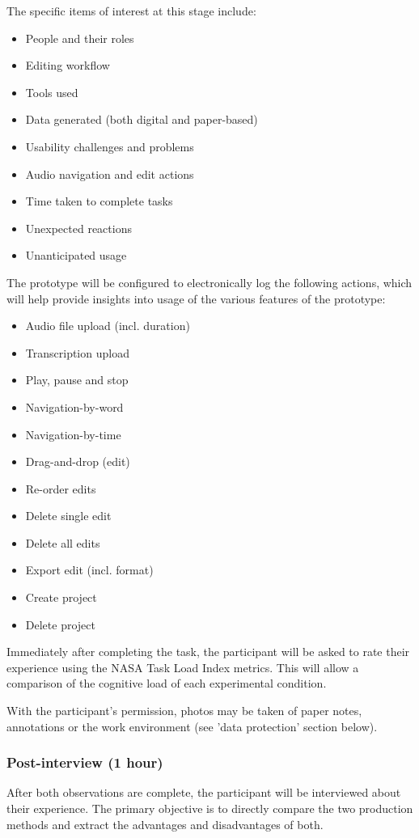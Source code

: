 The specific items of interest at this stage include:
\begin{itemize}
\item People and their roles
\item Editing workflow
\item Tools used
\item Data generated (both digital and paper-based)
\item Usability challenges and problems
\item Audio navigation and edit actions
\item Time taken to complete tasks
\item Unexpected reactions
\item Unanticipated usage
\end{itemize}

The prototype will be configured to electronically log the following actions,
which will help provide insights into usage of the various features of the
prototype:
\begin{itemize}
\item Audio file upload (incl. duration)
\item Transcription upload
\item Play, pause and stop
\item Navigation-by-word
\item Navigation-by-time
\item Drag-and-drop (edit)
\item Re-order edits
\item Delete single edit
\item Delete all edits
\item Export edit (incl. format)
\item Create project
\item Delete project
\end{itemize}

Immediately after completing the task, the participant will be asked to rate
their experience using the NASA Task Load Index \cite{Hart1988} metrics. This
will allow a comparison of the cognitive load of each experimental condition.

With the participant's permission, photos may be taken of paper notes,
annotations or the work environment (see 'data protection' section below).

\subsubsection{Post-interview (1 hour)}
After both observations are complete, the participant will be interviewed about
their experience. The primary objective is to directly compare the two
production methods and extract the advantages and disadvantages of both.

